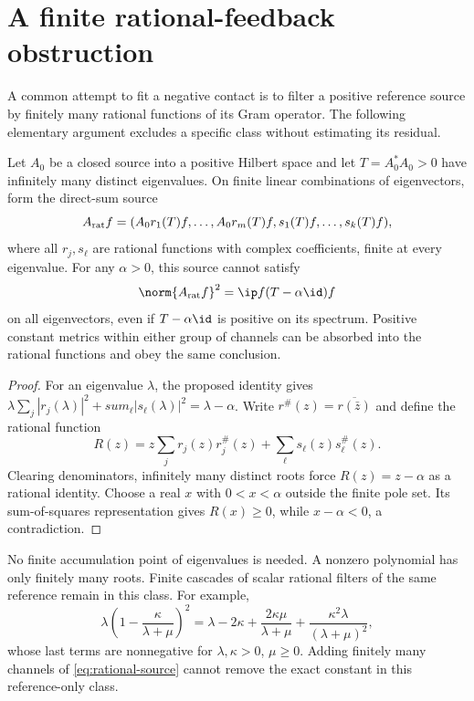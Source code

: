 \section{A finite rational-feedback obstruction}\label{app:rational}
A common attempt to fit a negative contact is to filter a positive
reference source by finitely many rational functions of its Gram
operator. The following elementary argument excludes a specific class
without estimating its residual.

\begin{proposition}\label{prop:rational}
Let $A_0$ be a closed source into a positive Hilbert space and let
$T=A_0^*A_0>0$ have infinitely many distinct eigenvalues. On finite
linear combinations of eigenvectors, form the direct-sum source
\begin{equation}\label{eq:rational-source}
 A_{\rm rat}f=(A_0r_1(T)f,\ldots,A_0r_m(T)f,
                 s_1(T)f,\ldots,s_k(T)f),
\end{equation}
where all $r_j,s_\ell$ are rational functions with complex coefficients,
finite at every eigenvalue. For any $\alpha>0$, this source cannot
satisfy
\begin{equation}\label{eq:rational-target}
 \norm{A_{\rm rat}f}^2=\ip f{(T-\alpha\id)f}
\end{equation}
on all eigenvectors, even if $T-\alpha\id$ is positive on its spectrum.
Positive constant metrics within either group of channels can be
absorbed into the rational functions and obey the same conclusion.
\end{proposition}
\begin{proof}
For an eigenvalue $\lambda$, the proposed identity gives
$\lambda\sum_j|r_j(\lambda)|^2+sum_\ell|s_\ell(\lambda)|^2
=\lambda-\alpha$. Write
$r^\#(z)=\overline{r(\bar z)}$ and define the rational function
\begin{equation}\label{eq:rational-identity}
 R(z)=z\sum_jr_j(z)r_j^\#(z)
              +\sum_\ell s_\ell(z)s_\ell^\#(z).
\end{equation}
Clearing denominators, infinitely many distinct roots force
$R(z)=z-\alpha$ as a rational identity. Choose a real $x$ with
$0<x<\alpha$ outside the finite pole set. Its sum-of-squares
representation gives $R(x)\geq0$, while $x-\alpha<0$, a contradiction.
\end{proof}
No finite accumulation point of eigenvalues is needed. A nonzero
polynomial has only finitely many roots. Finite cascades of scalar
rational filters of the same reference remain in this class.
For example,
\begin{equation}\label{eq:rational-example}
 \lambda\left(1-\frac\kappa{\lambda+\mu}\right)^2
 =\lambda-2\kappa+\frac{2\kappa\mu}{\lambda+\mu}
             +\frac{\kappa^2\lambda}{(\lambda+\mu)^2},
\end{equation}
whose last terms are nonnegative for $\lambda,\kappa>0$, $\mu\geq0$.
Adding finitely many channels of \eqref{eq:rational-source} cannot
remove the exact constant in this reference-only class.

